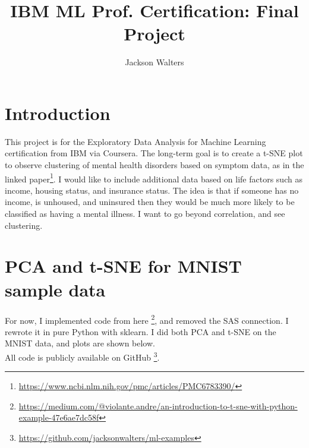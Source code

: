 \documentclass[11pt]{amsart}
\begin{document}
\title{IBM ML Prof. Certification: Final Project}
\date{}                                           %

\author[J.~Walters]{Jackson Walters}
\address[J.~Walters]{Arlington, VA}

\maketitle

\section{Introduction}

This project is for the Exploratory Data Analysis for Machine Learning certification from IBM via Coursera. The long-term goal is to create a t-SNE plot to observe clustering of mental health disorders based on symptom data, as in the linked paper\footnote{\url{https://www.ncbi.nlm.nih.gov/pmc/articles/PMC6783390/}}. I would like to include additional data based on life factors such as income, housing status, and insurance status. The idea is that if someone has no income, is unhoused, and uninsured then they would be much more likely to be classified as having a mental illness. I want to go beyond correlation, and see clustering. \\


\section{PCA and t-SNE for MNIST sample data}

For now, I implemented code from here \footnote{\url{https://medium.com/@violante.andre/an-introduction-to-t-sne-with-python-example-47e6ae7dc58f}}, and removed the SAS connection. I rewrote it in pure Python with sklearn. I did both PCA and t-SNE on the MNIST data, and plots are shown below. \\

All code is publicly available on GitHub \footnote{\url{https://github.com/jacksonwalters/ml-examples}}.
\end{document}

